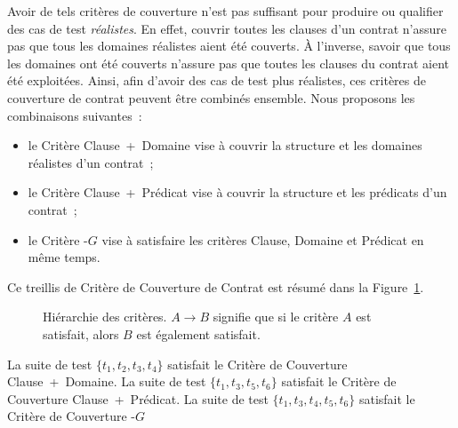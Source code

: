 Avoir de tels critères de couverture n'est pas suffisant pour produire ou
qualifier des cas de test {\em réalistes}. En effet, couvrir toutes les clauses
d'un contrat n'assure pas que tous les domaines réalistes aient été couverts. À
l'inverse, savoir que tous les domaines ont été couverts n'assure pas que toutes
les clauses du contrat aient été exploitées. Ainsi, afin d'avoir des cas de test
plus réalistes, ces critères de couverture de contrat peuvent être combinés
ensemble.  Nous proposons les combinaisons suivantes~:
%
\begin{itemize}

\item le Critère Clause~+~Domaine vise à couvrir la structure et les domaines
réalistes d'un contrat~;

\item le Critère Clause~+~Prédicat vise à couvrir la structure et les prédicats
d'un contrat~;

\item le Critère -$G$ vise à satisfaire les critères Clause,
Domaine et Prédicat en même temps.

\end{itemize}
%
Ce {\strong treillis} de Critère de Couverture de Contrat est résumé dans la
Figure~\ref{figure:test:lattice}.

\begin{figure}


\caption{\label{figure:test:lattice} Hiérarchie des critères. $A \rightarrow B$
signifie que si le critère $A$ est satisfait, alors $B$ est également
satisfait.}

\end{figure}

\begin{example}

La suite de test $\{t_1, t_2, t_3, t_4\}$ satisfait le Critère de Couverture
Clause~+~Domaine. La suite de test $\{t_1, t_3, t_5, t_6\}$ satisfait le Critère
de Couverture Clause~+~Prédicat. La suite de test $\{t_1, t_3, t_4, t_5, t_6\}$
satisfait le Critère de Couverture -$G$

\end{example}
